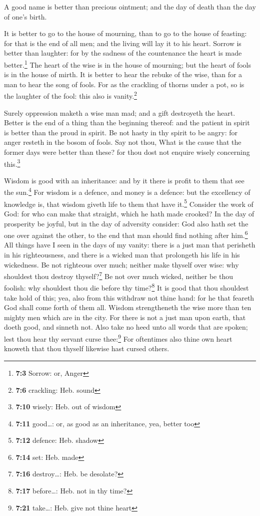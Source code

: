  A good name is better than precious ointment; and the day
of death than the day of one's birth.

 It is better to go to the house of mourning, than to go
to the house of feasting: for that is the end of all men; and the living
will lay it to his heart.  Sorrow is better than laughter:
for by the sadness of the countenance the heart is made
better.\footnote{\textbf{7:3} Sorrow: or, Anger}  The
heart of the wise is in the house of mourning; but the heart of fools is
in the house of mirth.  It is better to hear the rebuke of
the wise, than for a man to hear the song of fools.  For
as the crackling of thorns under a pot, so is the laughter of the fool:
this also is vanity.\footnote{\textbf{7:6} crackling: Heb. sound}

 Surely oppression maketh a wise man mad; and a gift
destroyeth the heart.  Better is the end of a thing than
the beginning thereof: and the patient in spirit is better than the
proud in spirit.  Be not hasty in thy spirit to be angry:
for anger resteth in the bosom of fools.  Say not thou,
What is the cause that the former days were better than these? for thou
dost not enquire wisely concerning this.\footnote{\textbf{7:10} wisely:
  Heb. out of wisdom}

 Wisdom is good with an inheritance: and by it there is
profit to them that see the sun.\footnote{\textbf{7:11} good\ldots: or,
  as good as an inheritance, yea, better too}  For wisdom
is a defence, and money is a defence: but the excellency of knowledge
is, that wisdom giveth life to them that have it.\footnote{\textbf{7:12}
  defence: Heb. shadow}  Consider the work of God: for
who can make that straight, which he hath made crooked? 
In the day of prosperity be joyful, but in the day of adversity
consider: God also hath set the one over against the other, to the end
that man should find nothing after him.\footnote{\textbf{7:14} set: Heb.
  made}  All things have I seen in the days of my vanity:
there is a just man that perisheth in his righteousness, and there is a
wicked man that prolongeth his life in his wickedness. 
Be not righteous over much; neither make thyself over wise: why
shouldest thou destroy thyself?\footnote{\textbf{7:16} destroy\ldots:
  Heb. be desolate?}  Be not over much wicked, neither be
thou foolish: why shouldest thou die before thy time?\footnote{\textbf{7:17}
  before\ldots: Heb. not in thy time?}  It is good that
thou shouldest take hold of this; yea, also from this withdraw not thine
hand: for he that feareth God shall come forth of them all.
 Wisdom strengtheneth the wise more than ten mighty men
which are in the city.  For there is not a just man upon
earth, that doeth good, and sinneth not.  Also take no
heed unto all words that are spoken; lest thou hear thy servant curse
thee:\footnote{\textbf{7:21} take\ldots: Heb. give not thine heart}
 For oftentimes also thine own heart knoweth that thou
thyself likewise hast cursed others.

